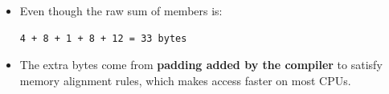 \documentclass[10pt]{article}
\begin{document}
\begin{itemize}
    Memory layout (typical alignment):
\begin{verbatim}
id              4 bytes
padding         4 bytes   // align double

gpa             8 bytes

grade           1 byte
padding         7 bytes   // align Address

address         8 bytes

birth           12 bytes

padding         4 bytes   // final alignment
-----------------------------------------------
Total          40 bytes
\end{verbatim}

    \item Even though the raw sum of members is:
\begin{verbatim}
4 + 8 + 1 + 8 + 12 = 33 bytes
\end{verbatim}

    \item The extra bytes come from \textbf{padding added by the compiler}
    to satisfy memory alignment rules, which makes access faster on most CPUs.
\end{itemize}

\newpage
\end{document}
